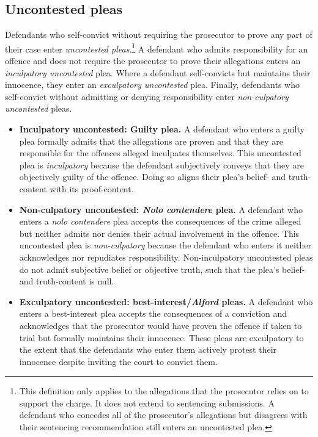 \subsection{Uncontested pleas}

Defendants who self-convict without requiring the prosecutor to prove any part of their case enter \textit{uncontested pleas}.\footnote{This definition only applies to the allegations that the prosecutor relies on to support the charge. It does not extend to sentencing submissions. A defendant who concedes all of the prosecutor's allegations but disagrees with their sentencing recommendation still enters an uncontested plea.} A defendant who admits responsibility for an offence and does not require the prosecutor to prove their allegations enters an \textit{inculpatory uncontested} plea. Where a defendant self-convicts but maintains their innocence, they enter an \textit{exculpatory uncontested} plea. Finally, defendants who self-convict without admitting or denying responsibility enter \textit{non-culpatory uncontested} pleas. 

\begin{itemize}

    \item \textbf{Inculpatory uncontested: Guilty plea.} A defendant who enters a guilty plea formally admits that the allegations are proven and that they are responsible for the offences alleged inculpates themselves. This uncontested plea is \textit{inculpatory} because the defendant subjectively conveys that they are objectively guilty of the offence. Doing so aligns their plea's belief- and truth-content with its proof-content.
    
    \item \textbf{Non-culpatory uncontested: \textit{Nolo contendere} plea.} A defendant who enters a \textit{nolo contendere} plea accepts the consequences of the crime alleged but neither admits nor denies their actual involvement in the offence. This uncontested plea is \textit{non-culpatory} because the defendant who enters it neither acknowledges nor repudiates responsibility. Non-inculpatory uncontested pleas do not admit subjective belief or objective truth, such that the plea's belief- and truth-content is null.

    \item \textbf{Exculpatory uncontested: best-interest/\textit{Alford} pleas.} A defendant who enters a best-interest plea accepts the consequences of a conviction and acknowledges that the prosecutor would have proven the offence if taken to trial but formally maintains their innocence. These pleas are exculpatory to the extent that the defendants who enter them actively protest their innocence despite inviting the court to convict them.
    
\end{itemize}

